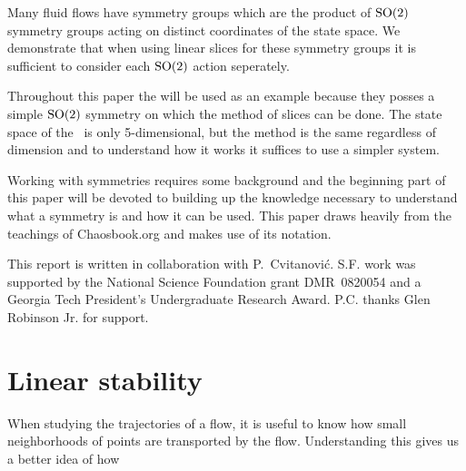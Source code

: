 Many fluid flows have symmetry groups which are the product of $\textrm{SO}(2)$ symmetry groups acting on distinct coordinates of the state space. We demonstrate that when using linear slices for these symmetry groups it is sufficient to consider each $\textrm{SO}(2)$ action seperately.

Throughout this paper the \cLe {} will be used as an example because they posses a simple $\textrm{SO}(2)$ symmetry on which the method of slices can be done. The state space of the \cLe\ is only 5-dimensional, but the method is the same regardless of dimension and to understand how it works it suffices to use a simpler system.

Working with symmetries requires some background and the beginning part of this paper will be devoted to building up the knowledge necessary to understand what a symmetry is and how it can be used. This paper draws heavily from the teachings of Chaosbook.org and makes use of its notation.



This report is written in collaboration with
P.~Cvitanovi\'c.
S.F. work was supported by the National Science Foundation
grant DMR~0820054 and a Georgia Tech President's Undergraduate
Research Award.
P.C. thanks Glen Robinson Jr. for support. 	

    \ifarticle
    \else

\section{Linear stability}
\label{sect:stability}

When studying the trajectories of a flow, it is useful to
know how small neighborhoods of points are transported by the
flow. Understanding this gives us a better idea of how

